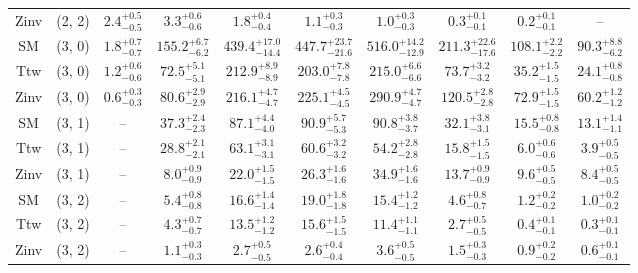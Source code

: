 \begin{table}[h!]
{\begin{tabular}{cccccccccc}
	Zinv & (2, 2) & $2.4^{+ 0.5 }_{- 0.5 }$ & $3.3^{+ 0.6 }_{- 0.6 }$ & $1.8^{+ 0.4 }_{- 0.4 }$ & $1.1^{+ 0.3 }_{- 0.3 }$ & $1.0^{+ 0.3 }_{- 0.3 }$ & $0.3^{+ 0.1 }_{- 0.1 }$ & $0.2^{+ 0.1 }_{- 0.1 }$ & -- \\[0.5ex] 
	SM & (3, 0) & $1.8^{+ 0.7 }_{- 0.7 }$ & $155.2^{+ 6.7 }_{- 6.2 }$ & $439.4^{+ 17.0 }_{- 14.4 }$ & $447.7^{+ 23.7 }_{- 21.6 }$ & $516.0^{+ 14.2 }_{- 12.9 }$ & $211.3^{+ 22.6 }_{- 17.6 }$ & $108.1^{+ 2.2 }_{- 2.2 }$ & $90.3^{+ 8.8 }_{- 6.2 }$ \\[0.5ex] 
	Ttw & (3, 0) & $1.2^{+ 0.6 }_{- 0.6 }$ & $72.5^{+ 5.1 }_{- 5.1 }$ & $212.9^{+ 8.9 }_{- 8.9 }$ & $203.0^{+ 7.8 }_{- 7.8 }$ & $215.0^{+ 6.6 }_{- 6.6 }$ & $73.7^{+ 3.2 }_{- 3.2 }$ & $35.2^{+ 1.5 }_{- 1.5 }$ & $24.1^{+ 0.8 }_{- 0.8 }$ \\[0.5ex] 
	Zinv & (3, 0) & $0.6^{+ 0.3 }_{- 0.3 }$ & $80.6^{+ 2.9 }_{- 2.9 }$ & $216.1^{+ 4.7 }_{- 4.7 }$ & $225.1^{+ 4.5 }_{- 4.5 }$ & $290.9^{+ 4.7 }_{- 4.7 }$ & $120.5^{+ 2.8 }_{- 2.8 }$ & $72.9^{+ 1.5 }_{- 1.5 }$ & $60.2^{+ 1.2 }_{- 1.2 }$ \\[0.5ex] 
	SM & (3, 1) & -- & $37.3^{+ 2.4 }_{- 2.3 }$ & $87.1^{+ 4.4 }_{- 4.0 }$ & $90.9^{+ 5.7 }_{- 5.3 }$ & $90.8^{+ 3.8 }_{- 3.7 }$ & $32.1^{+ 3.8 }_{- 3.1 }$ & $15.5^{+ 0.8 }_{- 0.8 }$ & $13.1^{+ 1.4 }_{- 1.1 }$ \\[0.5ex] 
	Ttw & (3, 1) & -- & $28.8^{+ 2.1 }_{- 2.1 }$ & $63.1^{+ 3.1 }_{- 3.1 }$ & $60.6^{+ 3.2 }_{- 3.2 }$ & $54.2^{+ 2.8 }_{- 2.8 }$ & $15.8^{+ 1.5 }_{- 1.5 }$ & $6.0^{+ 0.6 }_{- 0.6 }$ & $3.9^{+ 0.5 }_{- 0.5 }$ \\[0.5ex] 
	Zinv & (3, 1) & -- & $8.0^{+ 0.9 }_{- 0.9 }$ & $22.0^{+ 1.5 }_{- 1.5 }$ & $26.3^{+ 1.6 }_{- 1.6 }$ & $34.9^{+ 1.6 }_{- 1.6 }$ & $13.7^{+ 0.9 }_{- 0.9 }$ & $9.6^{+ 0.5 }_{- 0.5 }$ & $8.4^{+ 0.5 }_{- 0.5 }$ \\[0.5ex] 
	SM & (3, 2) & -- & $5.4^{+ 0.8 }_{- 0.8 }$ & $16.6^{+ 1.4 }_{- 1.4 }$ & $19.0^{+ 1.8 }_{- 1.8 }$ & $15.4^{+ 1.2 }_{- 1.2 }$ & $4.6^{+ 0.8 }_{- 0.7 }$ & $1.2^{+ 0.2 }_{- 0.2 }$ & $1.0^{+ 0.2 }_{- 0.2 }$ \\[0.5ex] 
	Ttw & (3, 2) & -- & $4.3^{+ 0.7 }_{- 0.7 }$ & $13.5^{+ 1.2 }_{- 1.2 }$ & $15.6^{+ 1.5 }_{- 1.5 }$ & $11.4^{+ 1.1 }_{- 1.1 }$ & $2.7^{+ 0.5 }_{- 0.5 }$ & $0.4^{+ 0.1 }_{- 0.1 }$ & $0.3^{+ 0.1 }_{- 0.1 }$ \\[0.5ex] 
	Zinv & (3, 2) & -- & $1.1^{+ 0.3 }_{- 0.3 }$ & $2.7^{+ 0.5 }_{- 0.5 }$ & $2.6^{+ 0.4 }_{- 0.4 }$ & $3.6^{+ 0.5 }_{- 0.5 }$ & $1.5^{+ 0.3 }_{- 0.3 }$ & $0.9^{+ 0.2 }_{- 0.2 }$ & $0.6^{+ 0.1 }_{- 0.1 }$ \\[0.5ex] 

\end{tabular}}
\end{table}
